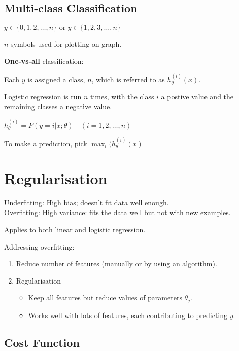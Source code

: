 \documentclass[12pt, a4paper]{article}
\begin{document}
  \subsection{Multi-class Classification}

    $y\in\{0,1,2,\dots,n\} \text{ or } y\in\{1,2,3,\dots,n\}$

    $n$ symbols used for plotting on graph.

    \textbf{One-vs-all} classification:

    Each $y$ is assigned a class, $n$, which is referred to as 
    $h_\theta^{(i)}(x)$.

    Logistic regression is run $n$ times, with the class $i$ a postive value and
    the remaining classes a negative value. 

    $h_\theta^{(i)} = P(y=i|x;\theta) \hspace{1em} (i = 1, 2,\dots,n)$

    To make a prediction, pick $\max_i(h_\theta^{(i)}(x)$

    \newpage

\section{Regularisation}

  Underfitting: High bias; doesn't fit data well enough.\\
  Overfitting: High variance: fits the data well but not with new examples.

  Applies to both linear and logistic regression.

  Addressing overfitting:
  \vspace{-1em}
  \begin{enumerate}
    \item Reduce number of features (manually or by using an algorithm).
    \item Regularisation
      \begin{itemize}
        \item Keep all features but reduce values of parameters $\theta_j$.
        \item Works well with lots of features, each contributing to 
          predicting $y$.
      \end{itemize}
  \end{enumerate}

  \subsection{Cost Function}
\end{document}
